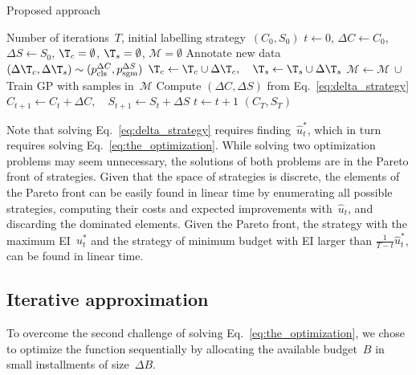 \begin{algorithm}[]
\caption{Proposed approach}
\label{alg:the_algorithm}
\begin{algorithmic}[1]
\Require Number of iterations~$T$, initial labelling strategy~$(C_0, S_0)$
\State $t\leftarrow 0$, $\Delta{}C\leftarrow C_0$, $\Delta{}S\leftarrow S_0$, $\T_c=\emptyset$, $\T_s=\emptyset$, $\mathcal{M}=\emptyset$
\State Annotate new data $(\Delta{}\T_c,\Delta{}\T_s)\sim{}(p_\textrm{cls}^{\Delta{}C}, p_\textrm{sgm}^{\Delta{}S})$
\State $\T_c \leftarrow \T_c \cup \Delta{}\T_c, \quad \T_s \leftarrow \T_s \cup \Delta{}\T_s$ 
\State $\mathcal{M} \leftarrow \mathcal{M} \,\cup\,$ %
\State Train GP with samples in~$\mathcal{M}$
\State Compute $(\Delta{}C, \Delta{}S)$ from Eq.~\eqref{eq:delta_strategy}
\State $C_{t+1} \leftarrow C_t + \Delta{}C, \quad S_{t+1} \leftarrow S_t + \Delta{}S$
\State $t\leftarrow t+1$
\EndWhile
\Ensure $(C_T, S_T)$
\end{algorithmic}
\end{algorithm}

Note that solving Eq.~\eqref{eq:delta_strategy} requires finding~$\hat{u}_t^*$, which in turn requires solving Eq.~\eqref{eq:the_optimization}. While solving two optimization problems may seem unnecessary, the solutions of both problems are in the Pareto front of strategies. Given that the space of strategies is discrete, the elements of the Pareto front can be easily found in linear time by enumerating all possible strategies, computing their costs and expected improvements with~$\hat{u}_t$, and discarding the dominated elements. Given the Pareto front, the strategy with the maximum EI~$u^*_t$ and the strategy of minimum budget with EI larger than $\frac{1}{T - t}\hat{u}^*_t$, can be found in linear time.

\iffalse
\subsection{Iterative approximation}
To overcome the second challenge of solving Eq.~\eqref{eq:the_optimization}, we chose to optimize the function sequentially by allocating the available budget~$B$ in small installments of size~$\Delta{}B$. 


